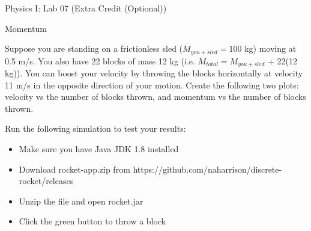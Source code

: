 \documentclass[12pt]{article}
\begin{document}
{\centering
\large Physics I: Lab 07 (Extra Credit (Optional)) \par
\large Momentum \par
}
\hfill \break \vspace{-4mm}

Suppose you are standing on a frictionless sled ($M_{you+sled} = 100$ kg) moving at 0.5 m/s.
You also have 22 blocks of mass 12 kg (i.e. $M_{total} = M_{you+sled}$ + 22(12 kg)).
You can boost your velocity by throwing the blocks horizontally at velocity 11 m/s in the opposite direction of your motion.
Create the following two plots: velocity vs the number of blocks thrown, and momentum vs the number of blocks thrown.
\hfill \break

Run the following simulation to test your results:
\begin{itemize}
\item Make sure you have Java JDK 1.8 installed
\item Download rocket-app.zip from https://github.com/naharrison/discrete-rocket/releases
\item Unzip the file and open rocket.jar
\item Click the green button to throw a block
\end{itemize}
\end{document}
